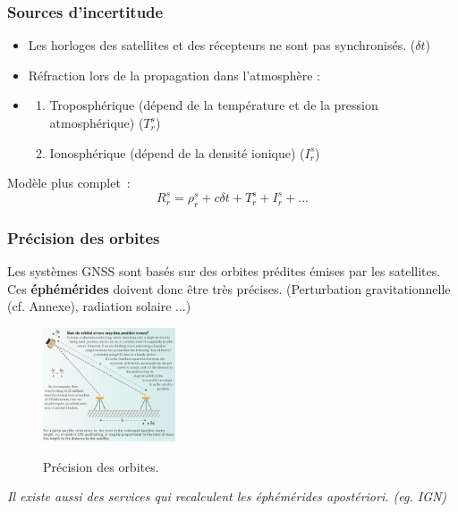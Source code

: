 \documentclass[xcolor=dvipsnames,envcountsect]{beamer}
\begin{document}
\begin{frame}
	\frametitle{Sources d'incertitude}
	\justifying
	\begin{itemize}
		\item Les horloges des satellites et des récepteurs ne sont pas synchronisés. ($\delta t$)
		\item Réfraction lors de la propagation dans l’atmosphère :
		\item \begin{enumerate}
			\item Troposphérique (dépend de la température et de la pression atmosphérique) ($T_r^s$)
			\item Ionosphérique (dépend de la densité ionique) ($I_r^s$)
		\end{enumerate}
	\end{itemize}
	Modèle plus complet :
	\begin{equation}
		\boxed{R_r^s = \rho_r^s + c\delta t + T_r^s + I_r^s + ...}
	\end{equation}
\end{frame}
\begin{frame}
	\frametitle{Précision des orbites}
	\justifying
	Les systèmes GNSS sont basés sur des orbites prédites émises par les satellites. \\
	Ces \textbf{éphémérides} doivent donc être très précises. {\tiny(Perturbation gravitationnelle (cf. Annexe), radiation solaire ...)} \\
	\begin{figure}
		\centering
		\includegraphics[width=0.35\textwidth]{./Figures/ENS_gnss2.png} \\
		\caption {Précision des orbites. \cite{ens}}
	\end{figure}
	{\small	\textit{Il existe aussi des services qui recalculent les éphémérides apostériori. (eg. IGN)}}
\end{frame}
\end{document}
